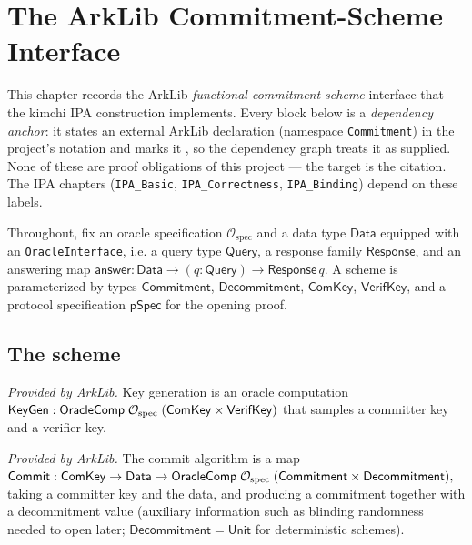 \providecommand{\oSpec}{\mathcal{O}_{\mathrm{spec}}}

\chapter{The ArkLib Commitment-Scheme Interface}

This chapter records the ArkLib \emph{functional commitment scheme} interface that the
kimchi IPA construction implements. Every block below is a \emph{dependency anchor}: it
states an external ArkLib declaration (namespace \texttt{Commitment}) in the project's
notation and marks it \mathlibok, so the dependency graph treats it as supplied. None of
these are proof obligations of this project — the \lean{} target is the citation. The IPA
chapters (\texttt{IPA\_Basic}, \texttt{IPA\_Correctness}, \texttt{IPA\_Binding}) depend on
these labels.

Throughout, fix an oracle specification $\oSpec$ and a data type $\mathsf{Data}$ equipped
with an \texttt{OracleInterface}, i.e. a query type $\mathsf{Query}$, a response family
$\mathsf{Response}$, and an answering map $\mathsf{answer} : \mathsf{Data} \to (q :
\mathsf{Query}) \to \mathsf{Response}\,q$. A scheme is parameterized by types
$\mathsf{Commitment}$, $\mathsf{Decommitment}$, $\mathsf{ComKey}$, $\mathsf{VerifKey}$,
and a protocol specification $\mathsf{pSpec}$ for the opening proof.

\section{The scheme}

\begin{definition}
  \label{def:commitment_keygen}
  \mathlibok
  \textit{Provided by ArkLib.}
  Key generation is an oracle computation
  \(
    \KeyGen : \mathsf{OracleComp}\;\oSpec\;(\mathsf{ComKey} \times \mathsf{VerifKey})
  \)
  that samples a committer key and a verifier key.
\end{definition}

\begin{definition}[Commit]
  \label{def:commitment_commit}
  \mathlibok
  \textit{Provided by ArkLib.}
  The commit algorithm is a map
  \(
    \Commit : \mathsf{ComKey} \to \mathsf{Data} \to
      \mathsf{OracleComp}\;\oSpec\;(\mathsf{Commitment} \times \mathsf{Decommitment}),
  \)
  taking a committer key and the data, and producing a commitment together with a
  decommitment value (auxiliary information such as blinding randomness needed to open
  later; $\mathsf{Decommitment} = \mathsf{Unit}$ for deterministic schemes).
\end{definition}

